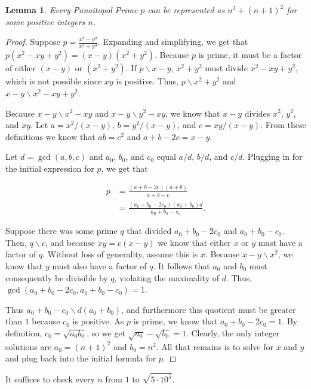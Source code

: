 \documentclass{article}
\newtheorem{lemma}{Lemma}
\begin{document}
\begin{lemma}
Every Panaitopol Prime $p$ can be represented as $n^2+(n+1)^2$ for some positive integers $n$. 
\end{lemma}

\begin{proof}

Suppose $p = \frac{x^4-y^4}{x^3+y^3}$. Expanding and simplifying, we get that $p(x^2-xy+y^2) = (x-y)(x^2+y^2)$. Because $p$ is prime, it must be a factor of either $(x - y)$ or $(x^2 + y^2)$. If $p\backslash x-y$, $x^2+y^2$ must divide $x^2-xy+y^2$, which is not possible since $xy$ is positive. Thus, $p\backslash x^2+y^2$ and $x-y\backslash x^2-xy+y^2$.

Because $x-y\backslash x^2-xy$ and $x-y\backslash y^2-xy$, we know that $x-y$ divides $x^2$, $y^2$, and $xy$. Let $a=x^2/(x-y)$, $b=y^2/(x-y)$, and $c=xy/(x-y)$. From these definitions we know that $ab=c^2$ and $a+b-2c=x-y$. 

Let $d=\gcd(a,b,c)$ and $a_0$, $b_0$, and $c_0$ equal $a/d$, $b/d$, and $c/d$. Plugging in for the initial expression for $p$, we get that 

\begin{align*}
p&=\frac{(a+b-2c)(a+b)}{a+b-c} \\
&=\frac{(a_0+b_0-2c_0)(a_0+b_0)d}{a_0+b_0-c_0}.
\end{align*}

Suppose there was some prime $q$ that divided $a_0+b_0-2c_0$ and $a_0+b_0-c_0$. Then, $q\backslash c$, and because $xy=c(x-y)$ we know that either $x$ or $y$ must have a factor of $q$. Without loss of generality, assume this is $x$. Because $x-y\backslash x^2$, we know that $y$ must also have a factor of $q$. It follows that $a_0$ and $b_0$ must consequently be divisible by $q$, violating the maximality of $d$. Thus, $\gcd(a_0+b_0-2c_0, a_0+b_0-c_0) = 1$. 

Thus $a_0+b_0-c_0\backslash d(a_0+b_0)$, and furthermore this quotient must be greater than $1$ because $c_0$ is positive. As $p$ is prime, we know that $a_0+b_0-2c_0 = 1$. By definition, $c_0 = \sqrt{a_0b_0}$, so we get $\sqrt{a_0}-\sqrt{b_0}=1$. Clearly, the only integer solutions are $a_0=(n+1)^2$ and $b_0=n^2$. All that remains is to solve for $x$ and $y$ and plug back into the initial formula for $p$. 

\end{proof}

It suffices to check every $n$ from $1$ to $\sqrt{5\cdot 10^5}$. 
\end{document}
